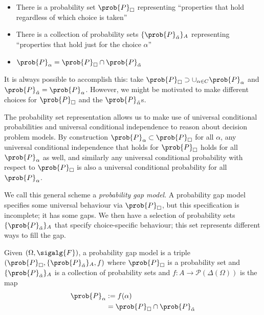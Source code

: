 \begin{itemize}
    \item There is a probability set $\prob{P}_\square$ representing ``properties that hold regardless of which choice is taken''
    \item There is a collection of probability sets $\{\prob{P}_{\tilde{\alpha}}\}_A$ representing ``properties that hold just for the choice $\alpha$''
    \item $\prob{P}_\alpha=\prob{P}_\square \cap \prob{P}_{\tilde{\alpha}}$
\end{itemize}

It is always possible to accomplish this: take $\prob{P}_\square\supset \cup_{\alpha\in C} \prob{P}_\alpha$ and $\prob{P}_{\tilde{\alpha}}=\prob{P}_\alpha$. However, we might be motivated to make different choices for $\prob{P}_\square$ and the $\prob{P}_{\tilde{\alpha}}$s.

The probability set representation allows us to make use of universal conditional probabilities and universal conditional independence to reason about decision problem models. By construction $\prob{P}_\alpha\subset \prob{P}_\square$ for all $\alpha$, any universal conditional independence that holds for $\prob{P}_\square$ holds for all $\prob{P}_\alpha$ as well, and similarly any universal conditional probability with respect to $\prob{P}_\square$ is also a universal conditional probability for all $\prob{P}_\alpha$.

We call this general scheme a \emph{probability gap model}. A probability gap model specifies some universal behaviour via $\prob{P}_\square$, but this specification is incomplete; it has some gaps. We then have a selection of probability sets $\{\prob{P}_{\tilde{\alpha}}\}_A$ that specify choice-specific behaviour; this set represents different ways to fill the gap.

\begin{definition}
Given $(\Omega,\sigalg{F})$, a probability gap model is a triple $(\prob{P}_\square,\{\prob{P}_{\tilde{\alpha}}\}_A,f)$ where $\prob{P}_\square$ is a probability set and $\{\prob{P}_{\tilde{\alpha}}\}_A$ is a collection of probability sets and $f:A\to \mathscr{P}(\Delta(\Omega))$ is the map
\begin{align}
    \prob{P}_\alpha&:=f(\alpha)\\
    &= \prob{P}_\square\cap \prob{P}_{\tilde{\alpha}}
\end{align}
\end{definition}



